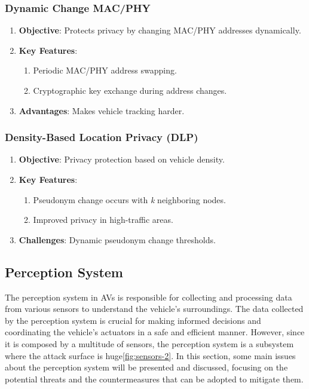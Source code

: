 \subsubsection{Dynamic Change MAC/PHY}
\begin{enumerate}
    \item \textbf{Objective}: Protects privacy by changing MAC/PHY addresses dynamically.
    \item \textbf{Key Features}:
    \begin{enumerate}
        \item Periodic MAC/PHY address swapping.
        \item Cryptographic key exchange during address changes.
    \end{enumerate}
    \item \textbf{Advantages}: Makes vehicle tracking harder.
\end{enumerate}

\subsubsection{Density-Based Location Privacy (DLP)}
\begin{enumerate}
    \item \textbf{Objective}: Privacy protection based on vehicle density.
    \item \textbf{Key Features}:
    \begin{enumerate}
        \item Pseudonym change occurs with \emph{k} neighboring nodes.
        \item Improved privacy in high-traffic areas.
    \end{enumerate}
    \item \textbf{Challenges}: Dynamic pseudonym change thresholds.
\end{enumerate}


\subsection{Perception System}\label{subsec:perception-system}

The perception system in AVs is responsible for collecting and processing data from various sensors to understand the vehicle's surroundings.
The data collected by the perception system is crucial for making informed decisions and coordinating the vehicle's actuators in a safe and efficient manner.
However, since it is composed by a multitude of sensors, the perception system is a subsystem where the attack surface is huge\ref{fig:sensors-2}.
In this section, some main issues about the perception system will be presented and discussed, focusing on the potential threats and the countermeasures that can be adopted to mitigate them\cite{sensors}.

